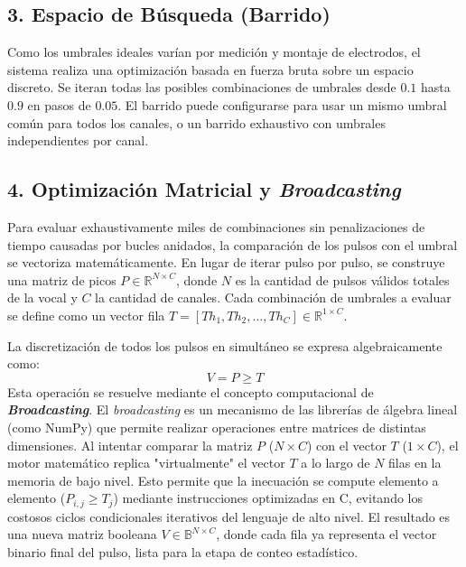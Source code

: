 \documentclass[12pt, a4paper]{article}
\begin{document}
\subsection{3. Espacio de Búsqueda (Barrido)}
Como los umbrales ideales varían por medición y montaje de electrodos, el sistema realiza una optimización basada en fuerza bruta sobre un espacio discreto. Se iteran todas las posibles combinaciones de umbrales desde $0.1$ hasta $0.9$ en pasos de $0.05$. El barrido puede configurarse para usar un mismo umbral común para todos los canales, o un barrido exhaustivo con umbrales independientes por canal.

\subsection{4. Optimización Matricial y \textit{Broadcasting}}
Para evaluar exhaustivamente miles de combinaciones sin penalizaciones de tiempo causadas por bucles anidados, la comparación de los pulsos con el umbral se vectoriza matemáticamente.
En lugar de iterar pulso por pulso, se construye una matriz de picos $P \in \mathbb{R}^{N \times C}$, donde $N$ es la cantidad de pulsos válidos totales de la vocal y $C$ la cantidad de canales. Cada combinación de umbrales a evaluar se define como un vector fila $T = [Th_1, Th_2, \dots, Th_C] \in \mathbb{R}^{1 \times C}$.

La discretización de todos los pulsos en simultáneo se expresa algebraicamente como:
\[
V = P \ge T
\]
Esta operación se resuelve mediante el concepto computacional de \textbf{\textit{Broadcasting}}. El \textit{broadcasting} es un mecanismo de las librerías de álgebra lineal (como NumPy) que permite realizar operaciones entre matrices de distintas dimensiones. Al intentar comparar la matriz $P$ ($N \times C$) con el vector $T$ ($1 \times C$), el motor matemático replica "virtualmente" el vector $T$ a lo largo de $N$ filas en la memoria de bajo nivel. 
Esto permite que la inecuación se compute elemento a elemento ($P_{i,j} \ge T_j$) mediante instrucciones optimizadas en C, evitando los costosos ciclos condicionales iterativos del lenguaje de alto nivel. El resultado es una nueva matriz booleana $V \in \mathbb{B}^{N \times C}$, donde cada fila ya representa el vector binario final del pulso, lista para la etapa de conteo estadístico.
\end{document}
